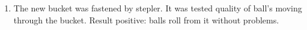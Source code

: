 \begin{enumerate}
\begin{enumerate}
		\item The new bucket was fastened by stepler. It was tested quality of ball's moving through the bucket. Result positive: balls roll from it without problems.
		\begin{figure}[H]
			\begin{minipage}[h]{0.2\linewidth}
				\center  
			\end{minipage}
			\hfill
			\begin{minipage}[h]{0.29\linewidth}
			\end{minipage}
			\hfill
			\begin{minipage}[h]{0.29\linewidth}

\end{minipage}
\end{figure}
\end{enumerate}
\end{enumerate}
